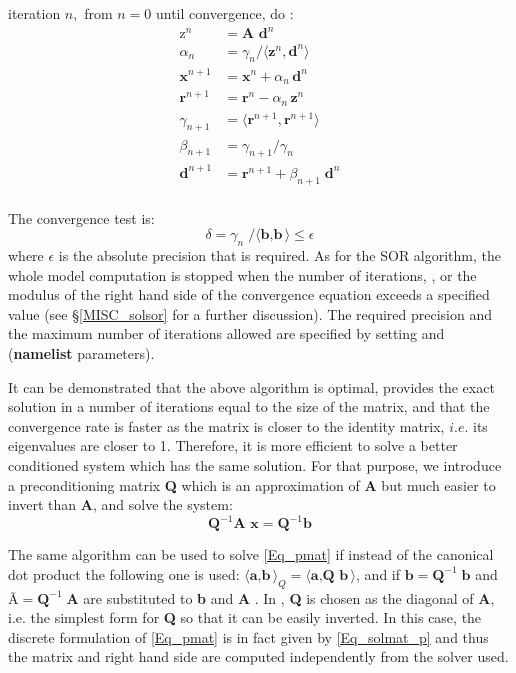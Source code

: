 \documentclass[NEMO_book]{subfiles}
\begin{document}
iteration $n,$ from $n=0$ until convergence, do :
\begin{equation} 
\begin{split}
\text{z}^n& = \textbf{A d}^n \\
\alpha_n &= \gamma_n /  \langle{ \textbf{z}^n , \textbf{d}^n} \rangle \\
\textbf{x}^{n+1} &= \textbf{x}^n + \alpha_n \,\textbf{d}^n \\
\textbf{r}^{n+1} &= \textbf{r}^n - \alpha_n \,\textbf{z}^n \\
\gamma_{n+1} &= \langle{ \textbf{r}^{n+1} , \textbf{r}^{n+1}} \rangle \\
\beta_{n+1} &= \gamma_{n+1}/\gamma_{n}  \\
\textbf{d}^{n+1} &= \textbf{r}^{n+1} + \beta_{n+1}\; \textbf{d}^{n}\\
\end{split}
\end{equation}


The convergence test is:
\begin{equation}
\delta = \gamma_{n}\; / \langle{ \textbf{b} , \textbf{b}} \rangle \leq \epsilon
\end{equation}
where $\epsilon $ is the absolute precision that is required. As for the SOR algorithm, 
the whole model computation is stopped when the number of iterations, , or 
the modulus of the right hand side of the convergence equation exceeds a 
specified value (see \S\ref{MISC_solsor} for a further discussion). The required 
precision and the maximum number of iterations allowed are specified by setting 
 and  (\textbf{namelist} parameters).

It can be demonstrated that the above algorithm is optimal, provides the exact 
solution in a number of iterations equal to the size of the matrix, and that 
the convergence rate is faster as the matrix is closer to the identity matrix,
$i.e.$ its eigenvalues are closer to 1. Therefore, it is more efficient to solve 
a better conditioned system which has the same solution. For that purpose, 
we introduce a preconditioning matrix \textbf{Q} which is an approximation 
of \textbf{A} but much easier to invert than \textbf{A}, and solve the system:
\begin{equation} \label{Eq_pmat}
\textbf{Q}^{-1} \textbf{A x} = \textbf{Q}^{-1} \textbf{b}
\end{equation}

The same algorithm can be used to solve \eqref{Eq_pmat} if instead of the 
canonical dot product the following one is used: 
${\langle{ \textbf{a} , \textbf{b}} \rangle}_Q = \langle{ \textbf{a} , \textbf{Q b}} \rangle$, and 
if $\textbf{\~{b}} = \textbf{Q}^{-1}\;\textbf{b}$ and $\textbf{\~{A}} = \textbf{Q}^{-1}\;\textbf{A}$ 
are substituted to \textbf{b} and \textbf{A} \citep{Madec_al_OM88}. 
In \NEMO, \textbf{Q} is chosen as the diagonal of \textbf{ A}, i.e. the simplest form for 
\textbf{Q} so that it can be easily inverted. In this case, the discrete formulation of 
\eqref{Eq_pmat} is in fact given by \eqref{Eq_solmat_p} and thus the matrix and 
right hand side are computed independently from the solver used.

\end{document}
